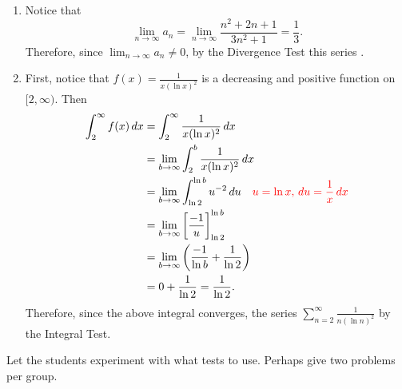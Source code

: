 \documentclass[]{ximera}
\begin{document}
\begin{problem}
\begin{freeResponse}
\begin{enumerate}
		\item  {}
		
		Notice that
			\[
			\lim_{n \to \infty} a_n = \lim_{n \to \infty} \frac{n^2 + 2n + 1}{3n^2 +1} = \frac{1}{3}.
			\]
		Therefore, since $\lim_{n \to \infty} a_n \neq 0$, by the Divergence Test this series .
		
		
	
		\item  {}
		
		First, notice that $f(x) = \frac{1}{x (\ln x)^2}$ is a decreasing and positive function on $[2,\infty)$.
		Then
			\begin{align*}
			\int_2^\infty f(x) \d x 
			&= \int_2^\infty \frac{1}{x (\ln x)^2} \d x  \\
			&= \lim_{b \to \infty} \int_2^b \frac{1}{x (\ln x)^2} \d x  \\
			&= \lim_{b \to \infty} \int_{\ln 2}^{\ln b} u^{-2} \d u  \quad  {\color{red} u = \ln x, \d u = \frac{1}{x} \d x}  \\
			&= \lim_{b \to \infty} \eval{\frac{-1}{u}}_{\ln 2}^{\ln b}  \\
			&= \lim_{b \to \infty} \left( \frac{-1}{\ln b} + \frac{1}{\ln 2} \right)  \\
			&= 0 + \frac{1}{\ln 2} = \frac{1}{\ln 2}.
			\end{align*}
		Therefore, since the above integral converges, the series $\sum_{n=2}^\infty \frac{1}{n(\ln n)^2}$  by the Integral Test.
	
		\end{enumerate}
	\end{freeResponse}
	
\end{problem}

\begin{instructorNotes}
Let the students experiment with what tests to use.  
Perhaps give two problems per group.
\end{instructorNotes}
\end{document}
